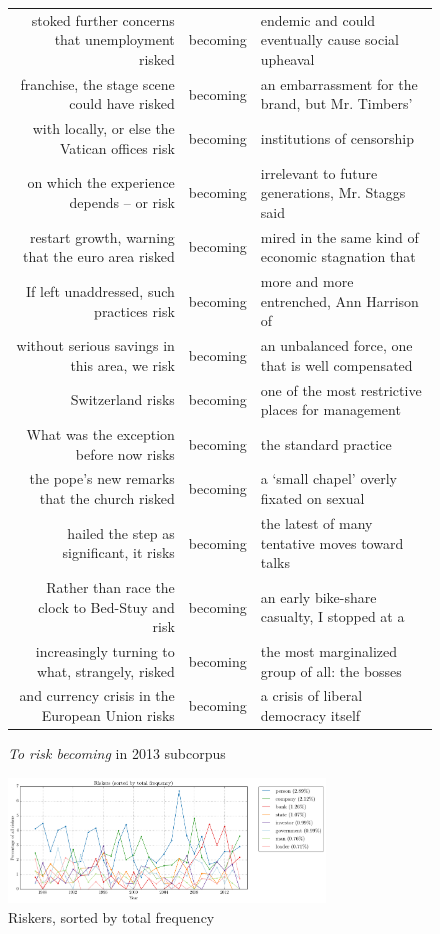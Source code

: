     \begin{figure}
    \footnotesize
    \begin{tabular}{rcl}
    stoked further concerns that unemployment risked &  becoming &  endemic and could eventually cause social upheaval  \\ 
    franchise, the stage scene could have risked &  becoming &  an embarrassment for the brand, but Mr. Timbers'   \\ 
    with locally, or else the Vatican offices risk &  becoming &  institutions of censorship   \\ 
    on which the experience depends -- or risk &  becoming &  irrelevant to future generations, Mr. Staggs said   \\ 
    restart growth, warning that the euro area risked &  becoming &  mired in the same kind of economic stagnation that   \\ 
    If left unaddressed, such practices risk &  becoming &  more and more entrenched, Ann Harrison of   \\ 
    without serious savings in this area, we risk &  becoming &  an unbalanced force, one that is well compensated   \\ 
    Switzerland risks &  becoming &  one of the most restrictive places for management   \\ 
    What was the exception before now risks &  becoming &  the standard practice   \\ 
    the pope's new remarks that the church risked &  becoming &  a `small chapel' overly fixated on sexual   \\ 
    hailed the step as significant, it risks &  becoming &  the latest of many tentative moves toward talks   \\ 
    Rather than race the clock to Bed-Stuy and risk &  becoming &  an early bike-share casualty, I stopped at a   \\ 
    increasingly turning to what, strangely, risked &  becoming &  the most marginalized group of all: the bosses   \\ 
    and currency crisis in the European Union risks &  becoming &  a crisis of liberal democracy itself \\ 
    \end{tabular}
    \caption{\emph{To risk becoming} in 2013 subcorpus}
    \end{figure}

    \begin{figure}[htb!]
    \centering
    \includegraphics[width=0.75\textwidth]{../images/riskers-sorted-by-total-frequency.png}
    \caption{Riskers, sorted by total frequency}
    \label{fig:riskers}
    \end{figure}

